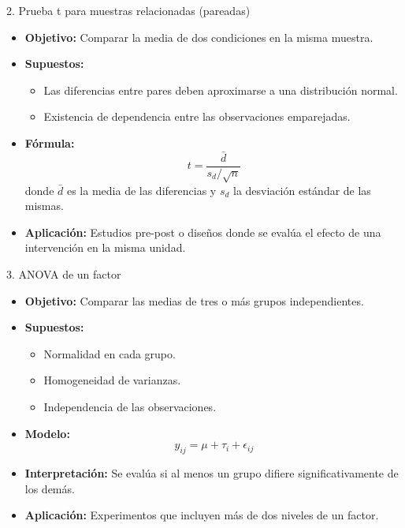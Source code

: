﻿\documentclass{beamer}
\begin{document}
\begin{frame}{2. Prueba t para muestras relacionadas (pareadas)}
\begin{itemize}
    \item \textbf{Objetivo:} Comparar la media de dos condiciones en la misma muestra.
    \item \textbf{Supuestos:}
    \begin{itemize}
         \item Las diferencias entre pares deben aproximarse a una distribución normal.
         \item Existencia de dependencia entre las observaciones emparejadas.
    \end{itemize}
    \item \textbf{Fórmula:}
    \[
    t = \frac{\bar{d}}{s_d/\sqrt{n}}
    \]
    donde $\bar{d}$ es la media de las diferencias y $s_d$ la desviación estándar de las mismas.
    \item \textbf{Aplicación:} Estudios pre-post o diseños donde se evalúa el efecto de una intervención en la misma unidad.
\end{itemize}
\end{frame}

\begin{frame}{3. ANOVA de un factor}
\begin{itemize}
    \item \textbf{Objetivo:} Comparar las medias de tres o más grupos independientes.
    \item \textbf{Supuestos:}
    \begin{itemize}
         \item Normalidad en cada grupo.
         \item Homogeneidad de varianzas.
         \item Independencia de las observaciones.
    \end{itemize}
    \item \textbf{Modelo:} 
    \[
    y_{ij} = \mu + \tau_i + \epsilon_{ij}
    \]
    \item \textbf{Interpretación:} Se evalúa si al menos un grupo difiere significativamente de los demás.
    \item \textbf{Aplicación:} Experimentos que incluyen más de dos niveles de un factor.
\end{itemize}
\end{frame}
\end{document}
